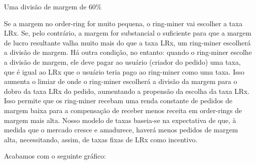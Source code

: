 \documentclass[UTF8,nofonts]{article}
\makeatletter
\newenvironment{figurehere}
 {\def\@captype{figure}}
 {}
\makeatother
\begin{document}
\begin{multicols}{2}
\begin{center}
\begin{figurehere}
\caption{Uma divisão de margem de 60\% }
\label{fig:marginsplit}
\end{figurehere}
\end{center}

Se a margem no order-ring for muito pequena, o ring-miner vai escolher a taxa LRx. Se, pelo contrário, a margem for substancial o suficiente para que a margem de lucro resultante valha muito mais do que a taxa LRx, um ring-miner escolherá a divisão de margem. Há outra condição, no entanto: quando o ring-miner escolhe a divisão de margem, ele deve pagar ao usuário (criador do pedido) uma taxa, que é igual ao LRx que o usuário teria pago ao ring-miner como uma taxa. Isso aumenta o limiar de onde o ring-miner escolherá a divisão da margem para o dobro da taxa LRx do pedido, aumentando a propensão da escolha da taxa LRx. Isso permite que os ring-miner recebam uma renda constante de pedidos de margem baixa para a compensação de receber menos receita em order-rings de margem mais alta. Nosso modelo de taxas baseia-se na expectativa de que, à medida que o mercado cresce e amadurece, haverá menos pedidos de margem alta, necessitando, assim, de taxas fixas de LRx como incentivo.


Acabamos com o seguinte gráfico:

\begin{center}
\begin{figurehere}
\centering
{}
\end{figurehere}
\end{center}
\end{multicols}
\end{document}
